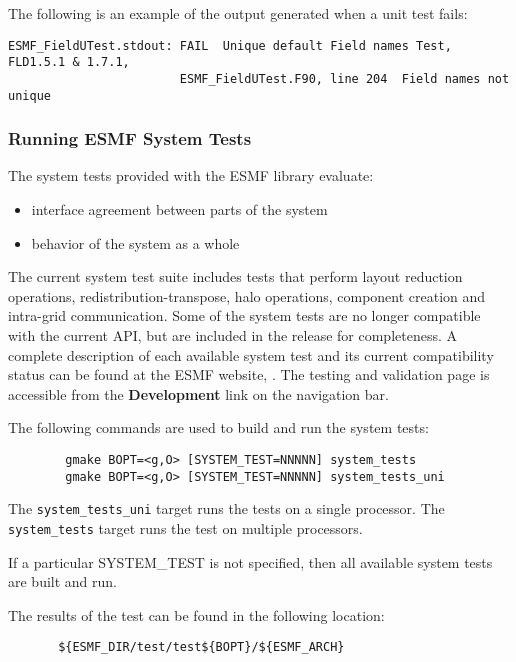 The following is an example of the output generated when a unit test fails:
\begin{verbatim}
ESMF_FieldUTest.stdout: FAIL  Unique default Field names Test, FLD1.5.1 & 1.7.1,
                        ESMF_FieldUTest.F90, line 204  Field names not unique
\end{verbatim}

\subsubsection{Running ESMF System Tests}
\label{SystemTestDescription}

The system tests provided with the ESMF library evaluate:
\begin{itemize}
\item interface agreement between parts of the system
\item behavior of the system as a whole
\end{itemize}

The current system test suite includes tests that perform layout reduction operations, 
redistribution-transpose, halo operations, component creation and intra-grid communication. 
Some of the system tests are no longer compatible with the current API, but are included in
the release for completeness.
A complete description of each available system test and its current compatibility status
can be found at the ESMF website,
.  The testing
and validation page is accessible from the {\bf Development} link on the navigation bar.

The following commands are used to build and run the system tests:

\begin{verbatim}
        gmake BOPT=<g,O> [SYSTEM_TEST=NNNNN] system_tests
        gmake BOPT=<g,O> [SYSTEM_TEST=NNNNN] system_tests_uni
\end{verbatim}

The {\tt system\_tests\_uni} target runs the tests on a single processor. 
The {\tt system\_tests} target runs the test on multiple processors.

If a particular SYSTEM\_TEST is not specified, then all available system tests 
are built and run.

The results of the test can be found in the following location:
\begin{verbatim}
       ${ESMF_DIR/test/test${BOPT}/${ESMF_ARCH}
\end{verbatim}

